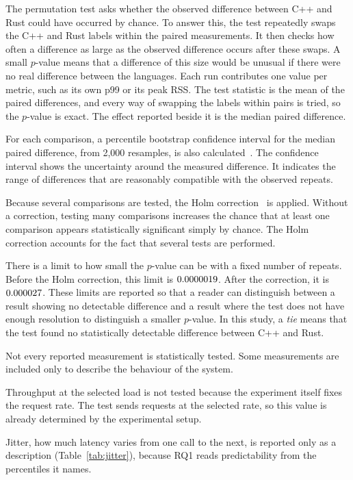 \documentclass[english,oneside,a4paper,censored,csm,software-track-2020]{HYthesisML}
\begin{document}
The permutation test asks whether the observed difference between C++ and Rust could
have occurred by chance. To answer this, the test repeatedly swaps the C++ and Rust
labels within the paired measurements. It then checks how often a difference as large
as the observed difference occurs after these swaps. A small $p$-value means that a
difference of this size would be unusual if there were no real difference between
the languages. Each run contributes one value per metric, such as its own p99 or its
peak RSS. The test statistic is the mean of the \NRepeats{} paired differences, and every
way of swapping the labels within pairs is tried, so the $p$-value is exact. The
effect reported beside it is the median paired difference.

For each comparison, a percentile bootstrap confidence interval for the median paired
difference, from 2{,}000 resamples, is also calculated~\cite{efron1993bootstrap}. The confidence interval shows the uncertainty
around the measured difference. It indicates the range of differences that are
reasonably compatible with the observed repeats.

Because several comparisons are tested, the Holm
correction~\cite{holm1979simple} is applied. Without a correction, testing many comparisons
increases the chance that at least one comparison appears statistically significant
simply by chance. The Holm correction accounts for the fact that several tests are
performed.

There is a limit to how small the $p$-value can be with a fixed number of repeats.
Before the Holm correction, this limit is $0.0000019$. After the correction,
it is $0.000027$. These limits are reported so that a reader can distinguish
between a result showing no detectable difference and a result where the test does
not have enough resolution to distinguish a smaller $p$-value. In this study, a
\emph{tie} means that the test found no statistically detectable difference between
C++ and Rust.

Not every reported measurement is statistically tested. Some measurements are
included only to describe the behaviour of the system.

Throughput at the selected load is not tested because the experiment itself fixes
the request rate. The test sends requests at the selected rate, so this value is
already determined by the experimental setup.

Jitter, how much latency varies from one call to the next, is reported only as a
description (Table~\ref{tab:jitter}), because RQ1 reads predictability from the
percentiles it names.
\end{document}
